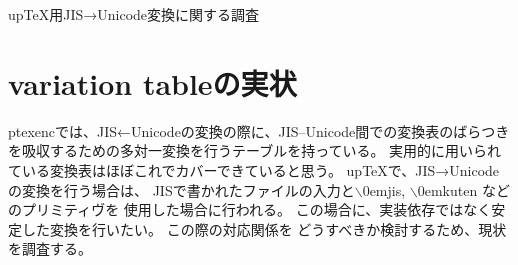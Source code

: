 \documentclass{ujarticle}
\edef\bs{$\backslash$\kern0em}
\begin{document}
\begin{center}
{\large upTeX用JIS→Unicode変換に関する調査}
\end{center}

\section{variation tableの実状}
ptexencでは、JIS←Unicodeの変換の際に、JIS--Unicode間での変換表のばらつき
を吸収するための多対一変換を行うテーブルを持っている。
実用的に用いられている変換表はほぼこれでカバーできていると思う。
upTeXで、JIS→Unicodeの変換を行う場合は、
JISで書かれたファイルの入力と\bs jis, \bs kuten などのプリミティヴを
使用した場合に行われる。
この場合に、実装依存ではなく安定した変換を行いたい。
この際の対応関係を
どうすべきか検討するため、現状を調査する。
\end{document}
